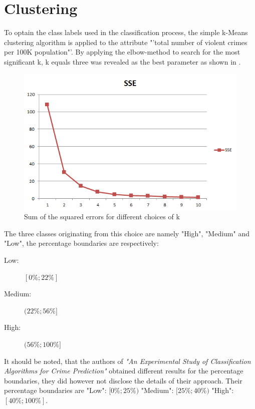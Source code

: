 \section{Clustering}
To optain the class labels used in the classification process, the simple k-Means clustering algorithm is applied to the attribute "'total number of violent crimes per
100K population"'. By applying the elbow-method to search for the most significant k, k equals three was revealed as the best parameter as shown in .
\begin{figure}[H]
	\centering
	\includegraphics[width=\columnwidth]{../../charts/SSE.png}
	\caption{Sum of the squared errors for different choices of k}
	\label{fig:sse}
\end{figure}
The three classes originating from this choice are namely "High", "Medium" and "Low", the percentage boundaries are respectively:
\begin{description}
	\item[Low:] \([0\%; 22\%]\) 
	\item[Medium:] \((22\%; 56\%]\)
	\item[High:] \((56\%; 100\%]\)
\end{description}

It should be noted, that the authors of \textit{"An Experimental Study of Classification Algorithms for Crime Prediction"} \cite{indian} obtained different results for the percentage boundaries, they did however not disclose the details of their approach. Their percentage boundaries are "Low": \([0\%;25\%)\) "Medium": \([25\%; 40\%)\) "High": \([40\%; 100\%]\).


